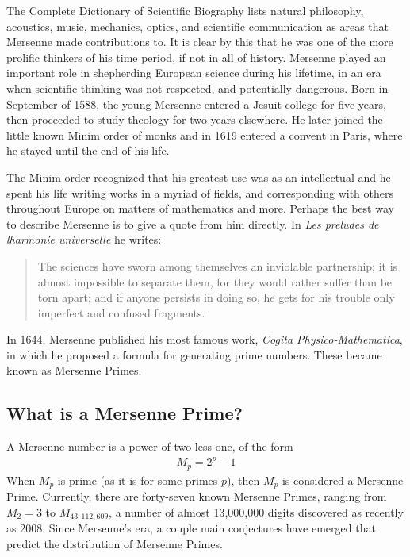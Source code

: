 
The Complete Dictionary of Scientific Biography\cite{scibio} lists natural philosophy, acoustics, music, mechanics, optics, and scientific communication as areas that Mersenne made contributions to.  It is clear by this that he was one of the more prolific thinkers of his time period, if not in all of history. Mersenne played an important role in shepherding European science during his lifetime, in an era when scientific thinking was not respected, and potentially dangerous.  Born in September of 1588, the young Mersenne entered a Jesuit college for five years, then proceeded to study theology for two years elsewhere. He later joined the little known Minim order of monks and in 1619 entered a convent in Paris, where he stayed until the end of his life.  

The Minim order recognized that his greatest use was as an intellectual and he spent his life writing works in a myriad of fields, and corresponding with others throughout Europe on matters of mathematics and more. Perhaps the best way to describe Mersenne is to give a quote from him directly. In \emph{Les preludes de lharmonie universelle} he writes:

\begin{quote}
The sciences have sworn among themselves an inviolable partnership; it is almost impossible to separate them, for they would rather suffer than be torn apart; and if anyone persists in doing so, he gets for his trouble only imperfect and confused fragments. \cite{lfrench}
\end{quote}

In 1644, Mersenne published his most famous work, \emph{Cogita Physico-Mathematica}, in which he proposed a formula for generating prime numbers. These became known as Mersenne Primes.

\subsection{What is a Mersenne Prime?}

A Mersenne number is a power of two less one, of the form
\begin{align}
M_p = 2^p - 1
\end{align}
When $M_p$ is prime (as it is for some primes $p$), then $M_p$ is considered a Mersenne Prime. Currently,
there are forty-seven known Mersenne Primes, ranging from $M_2 = 3$ to $M_{43,112,609}$, a number of almost
13,000,000 digits discovered as recently as 2008. Since Mersenne's era, a couple main conjectures have emerged
that predict the distribution of Mersenne Primes.

